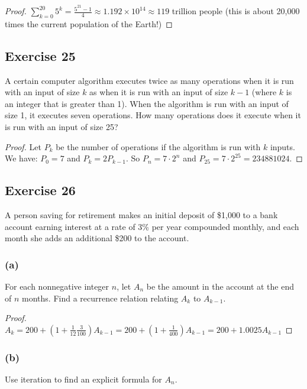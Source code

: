 \documentclass[14pt]{extarticle}
\newcommand{\dps}{\displaystyle}
\begin{document}
    \begin{proof}
        \(\dps \sum_{k = 0}^{20} 5^k = \frac{5^{21} - 1}{4} \approx 1.192 \times 10^{14} \approx 119\) trillion people
        (this is about 20,000 times the current population of the Earth!)
    \end{proof}

    \subsection{Exercise 25}
    A certain computer algorithm executes twice as many operations when it is run with an input of size $k$ as when
    it is run with an input of size $k - 1$ (where $k$ is an integer that is greater than 1). When the algorithm is run
with an input of size 1, it executes seven operations. How many operations does it execute when it is run with an
input of size 25?

\begin{proof}
    Let $P_k$ be the number of operations if the algorithm is run with $k$ inputs. We have: \(P_0 = 7\) and
    \(P_k = 2P_{k-1}\). So \(P_n = 7 \cdot 2^n\) and \(P_{25} = 7 \cdot 2^{25} = 234881024\).
\end{proof}

\subsection{Exercise 26}
A person saving for retirement makes an initial deposit of \$1,000 to a bank account earning interest at a rate of 3\%
per year compounded monthly, and each month she adds an additional \$200 to the account.

\subsubsection{(a)}
For each nonnegative integer $n$, let $A_n$ be the amount in the account at the end of $n$ months. Find a recurrence
relation relating $A_k$ to \(A_{k-1}\).

\begin{proof}
    \(A_k = 200 + (1 + \frac{1}{12}\frac{3}{100})A_{k-1} = 200 + (1 + \frac{1}{400})A_{k-1} = 200 + 1.0025 A_{k-1}\)
\end{proof}

\subsubsection{(b)}
Use iteration to find an explicit formula for \(A_n\).
\end{document}
